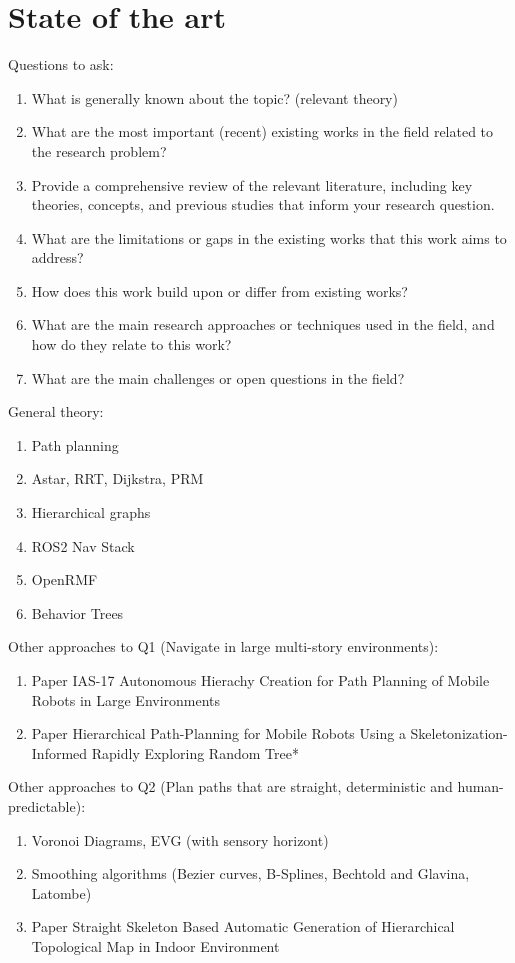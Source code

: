 \chapter{State of the art}
\label{sec:state_of_the_art}
Questions to ask:
\begin{enumerate}
    \item What is generally known about the topic? (relevant theory)
    \item What are the most important (recent) existing works in the field related to the research problem? 
    \item Provide a comprehensive review of the relevant literature, including key theories, concepts, and previous studies that inform your research question.
    \item What are the limitations or gaps in the existing works that this work aims to address? 
    \item How does this work build upon or differ from existing works? 
    \item What are the main research approaches or techniques used in the field, and how do they relate to this work? 
    \item What are the main challenges or open questions in the field? 
\end{enumerate}

General theory:
\begin{enumerate}
    \item Path planning
    \item Astar, RRT, Dijkstra, PRM
    \item Hierarchical graphs
    \item ROS2 Nav Stack
    \item OpenRMF
    \item Behavior Trees
\end{enumerate}

Other approaches to Q1 (Navigate in large multi-story environments):
\begin{enumerate}
    \item Paper IAS-17 Autonomous Hierachy Creation for Path Planning of Mobile Robots in Large Environments
    \item Paper Hierarchical Path-Planning for Mobile Robots Using a Skeletonization-Informed Rapidly Exploring Random Tree*
\end{enumerate}

Other approaches to Q2 (Plan paths that are straight, deterministic and human-predictable):
\begin{enumerate}
    \item Voronoi Diagrams, EVG (with sensory horizont)
    \item Smoothing algorithms (Bezier curves, B-Splines, Bechtold and Glavina, Latombe)
    \item Paper Straight Skeleton Based Automatic Generation of Hierarchical Topological Map in Indoor Environment
\end{enumerate}

